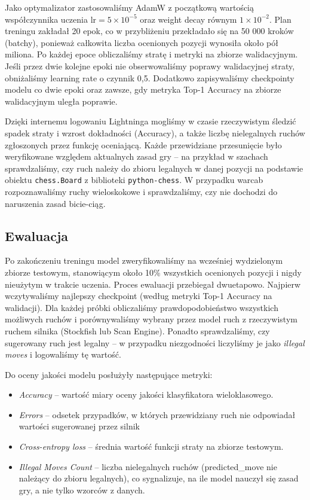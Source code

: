 \documentclass[12pt]{article}
\begin{document}
Jako optymalizator zastosowaliśmy AdamW z początkową wartością współczynnika uczenia \(\mathrm{lr} = 5 \times 10^{-5}\) oraz weight decay równym \(1 \times 10^{-2}\). Plan treningu zakładał 20 epok, co w przybliżeniu przekładało się na 50 000 kroków (batchy), ponieważ całkowita liczba ocenionych pozycji wynosiła około pół miliona. Po każdej epoce obliczaliśmy stratę i metryki na zbiorze walidacyjnym. Jeśli przez dwie kolejne epoki nie obserwowaliśmy poprawy walidacyjnej straty, obniżaliśmy learning rate o czynnik 0,5. Dodatkowo zapisywaliśmy checkpointy modelu co dwie epoki oraz zawsze, gdy metryka Top-1 Accuracy na zbiorze walidacyjnym uległa poprawie.

Dzięki internemu logowaniu Lightninga mogliśmy w czasie rzeczywistym śledzić spadek straty i wzrost dokładności (Accuracy), a także liczbę nielegalnych ruchów zgłoszonych przez funkcję oceniającą. Każde przewidziane przesunięcie było weryfikowane względem aktualnych zasad gry – na przykład w szachach sprawdzaliśmy, czy ruch należy do zbioru legalnych w danej pozycji na podstawie obiektu \texttt{chess.Board} z biblioteki \texttt{python-chess}. W przypadku warcab rozpoznawaliśmy ruchy wieloskokowe i sprawdzaliśmy, czy nie dochodzi do naruszenia zasad bicie-ciąg.

\subsection{Ewaluacja}

Po zakończeniu treningu model zweryfikowaliśmy na wcześniej wydzielonym zbiorze testowym, stanowiącym około 10\% wszystkich ocenionych pozycji i nigdy nieużytym w trakcie uczenia. Proces ewaluacji przebiegał dwuetapowo. Najpierw wczytywaliśmy najlepszy checkpoint (według metryki Top-1 Accuracy na walidacji). Dla każdej próbki obliczaliśmy prawdopodobieństwo wszystkich możliwych ruchów i porównywaliśmy wybrany przez model ruch z rzeczywistym ruchem silnika (Stockfish lub Scan Engine). Ponadto sprawdzaliśmy, czy sugerowany ruch jest legalny – w przypadku niezgodności liczyliśmy je jako \emph{illegal moves} i logowaliśmy tę wartość.

Do oceny jakości modelu posłużyły następujące metryki:
\begin{itemize}
    \item \emph{Accuracy} – wartość miary oceny jakości klasyfikatora wieloklasowego.
    \item \emph{Errors} – odsetek przypadków, w których przewidziany ruch nie odpowiadał wartości sugerowanej przez silnik
    \item \emph{Cross-entropy loss} – średnia wartość funkcji straty na zbiorze testowym.
    \item \emph{Illegal Moves Count} – liczba nielegalnych ruchów (predicted\_move nie należący do zbioru legalnych), co sygnalizuje, na ile model nauczył się zasad gry, a nie tylko wzorców z danych.
\end{itemize}
\end{document}
